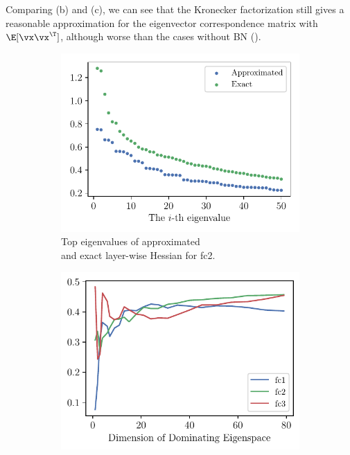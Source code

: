 Comparing (b) and (c), we can see that the Kronecker factorization still gives a reasonable approximation for the eigenvector correspondence matrix with $\E[\vx\vx^\T]$, although worse than the cases without BN ().

\begin{figure}[ht]
\centering
\begin{subfigure}[b]{0.35\textwidth}
        \captionsetup{justification=centering}
    \includegraphics[width=\textwidth]{Appendix_Figures/Explanation_LeNet5Case/BN/eigenval_compare_top50_CIFAR10_Exp1_LeNet5_BN_nl_fixlr0.01R2_E-1_fc1.pdf}
    \caption{Top eigenvalues of approximated \\and exact layer-wise Hessian for fc2.}
    \label{fig:app_exp_bn_approx_eigenvalues}
\end{subfigure}%
\begin{subfigure}[b]{0.35\textwidth}
        \captionsetup{justification=centering}
    \includegraphics[width=\textwidth]{Appendix_Figures/Explanation_LeNet5Case/BN/sample_kron_decomp_traceoverlap_d80_CIFAR10_Exp1_LeNet5_BN_nl_fixlr0.01R2_E-1.pdf}

\end{subfigure}
\end{figure}
